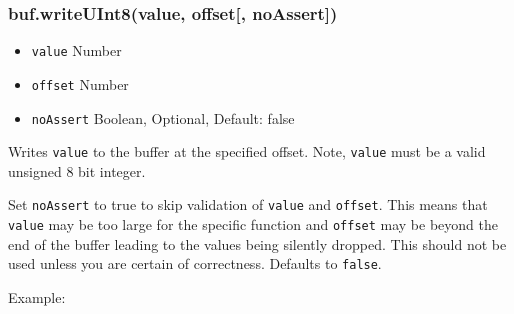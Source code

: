 \begin{Shaded}
\begin{Highlighting}[]
  \NormalTok{(}\NormalTok{);}

\NormalTok{buf[}\NormalTok{] = }\NormalTok{;}
\NormalTok{buf[}\NormalTok{] = }\NormalTok{;}
\NormalTok{buf[}\NormalTok{] = }\NormalTok{;}
\NormalTok{buf[}\NormalTok{] = }\NormalTok{;}
\NormalTok{buf[}\NormalTok{] = }\NormalTok{;}
\NormalTok{buf[}\NormalTok{] = }\NormalTok{;}
\NormalTok{buf[}\NormalTok{] = }\NormalTok{;}
\NormalTok{buf[}\NormalTok{] = }\NormalTok{;}

\NormalTok{(}\NormalTok{(}\NormalTok{));}

\end{Highlighting}
\end{Shaded}

\subsubsection{buf.writeUInt8(value, offset{[},
noAssert{]})}\label{buf.writeuint8value-offset-noassert}

\begin{itemize}
\itemsep1pt\parskip0pt
\item
  \texttt{value} Number
\item
  \texttt{offset} Number
\item
  \texttt{noAssert} Boolean, Optional, Default: false
\end{itemize}

Writes \texttt{value} to the buffer at the specified offset. Note,
\texttt{value} must be a valid unsigned 8 bit integer.

Set \texttt{noAssert} to true to skip validation of \texttt{value} and
\texttt{offset}. This means that \texttt{value} may be too large for the
specific function and \texttt{offset} may be beyond the end of the
buffer leading to the values being silently dropped. This should not be
used unless you are certain of correctness. Defaults to \texttt{false}.

Example:

